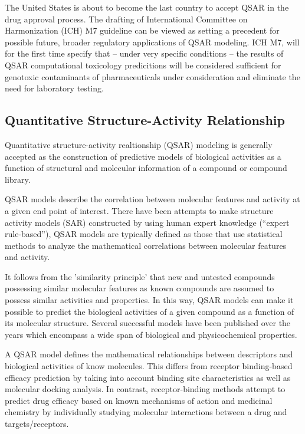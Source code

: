 The United States is about to become the last country to accept QSAR in the drug approval process. The drafting of International Committee on Harmonization (ICH) M7 guideline can be viewed as setting a precedent for possible future, broader regulatory applications of QSAR modeling. ICH M7, will for the first time specify that -- under very specific conditions -- the results of QSAR computational toxicology predicitions will be considered sufficient for genotoxic contaminants of pharmaceuticals under consideration and eliminate the need for laboratory testing. \cite{Kruhlak2012}


\subsection{Quantitative Structure-Activity Relationship}

Quantitative structure-activity realtionship (QSAR) modeling is generally accepted as the construction of predictive models of biological activities as a function of structural and molecular information of a compound or compound library.\cite{Nantasenamat2009}

QSAR models describe the correlation between molecular features and activity at a given end point of interest. There have been attempts to make structure activity models (SAR) constructed by using human expert knowledge (“expert rule-based”), QSAR models are typically defined as those that use statistical methods to analyze the mathematical correlations between molecular features and activity. 

It follows from the 'similarity principle' that new and untested compounds possessing similar molecular features as known compounds are assumed to possess similar activities and properties. In this way, QSAR models can make it possible to predict the biological activities of a given compound as a function of its molecular structure. Several successful models have been published over the years which encompass a wide span of biological and physicochemical properties.

A QSAR model defines the mathematical relationships between descriptors and biological activities of know molecules. This differs from receptor binding-based efficacy prediction by taking into account binding site characteristics as well as molecular docking analysis. In contrast, receptor-binding methods attempt to predict drug efficacy based on known mechanisms of action and medicinal chemistry by individually studying molecular interactions between a drug and targets/receptors. \cite{Kruhlak2012}

